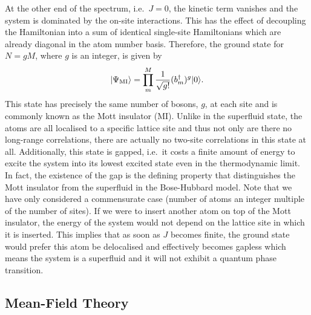 At the other end of the spectrum, i.e.~$J = 0$, the kinetic term
vanishes and the system is dominated by the on-site interactions. This
has the effect of decoupling the Hamiltonian into a sum of identical
single-site Hamiltonians which are already diagonal in the atom number
basis. Therefore, the ground state for $N = gM$, where $g$ is an
integer, is given by
\begin{equation}
  \label{eq:GSMI}
  | \Psi_\mathrm{MI} \rangle = \prod_m^M \frac{1} {\sqrt{g!}}
  (b^\dagger_m)^g | 0 \rangle.
\end{equation}
This state has precisely the same number of bosons, $g$, at each site
and is commonly known as the Mott insulator (MI). Unlike in the
superfluid state, the atoms are all localised to a specific lattice
site and thus not only are there no long-range correlations, there are
actually no two-site correlations in this state at all. Additionally,
this state is gapped, i.e.~it costs a finite amount of energy to
excite the system into its lowest excited state even in the
thermodynamic limit. In fact, the existence of the gap is the defining
property that distinguishes the Mott insulator from the superfluid in
the Bose-Hubbard model. Note that we have only considered a
commensurate case (number of atoms an integer multiple of the number
of sites). If we were to insert another atom on top of the Mott
insulator, the energy of the system would not depend on the lattice
site in which it is inserted. This implies that as soon as $J$ becomes
finite, the ground state would prefer this atom be delocalised and
effectively becomes gapless which means the system is a superfluid and
it will not exhibit a quantum phase transition.

\subsection{Mean-Field Theory}


